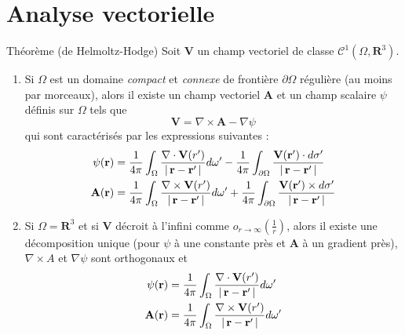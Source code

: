 \section*{Analyse vectorielle}

        \begin{omed}{Théorème (de Helmoltz-Hodge)}
            Soit $\mathbf{V}$ un champ vectoriel de classe $\mathcal{C}^1(\Omega,\mathbf{R}^3)$. 
            \begin{enumerate}[label=($p_{\arabic*}$)]
                \item Si $\Omega$ est un domaine \textit{compact} et \textit{connexe} de frontière $\partial \Omega$ régulière (au moins par morceaux), alors il existe un champ vectoriel $\mathbf{A}$ et un champ scalaire $\psi$ définis sur $\Omega$ tels que 
                \[ \mathbf{V} = \nabla \times \mathbf{A} - \nabla \psi \]    
                qui sont caractérisés par les expressions suivantes : 
                \begin{align*}
                    \psi(\mathbf{r}) &= \frac{1}{4\pi} \int_{\Omega} \frac{\nabla \cdot \mathbf{V}(r')}{\left\lvert \, \mathbf{r} - \mathbf{r}' \, \right\rvert} d\omega' - \frac{1}{4 \pi} \int_{\partial \Omega} \frac{\mathbf{V}(\mathbf{r}') \cdot d\mathbf{\sigma}'}{\left\lvert \, \mathbf{r} - \mathbf{r}' \, \right\rvert} \\
                    \mathbf{A}(\mathbf{r}) &= \frac{1}{4\pi} \int_{\Omega} \frac{\nabla \times \mathbf{V}(r')}{\left\lvert \, \mathbf{r} - \mathbf{r}' \, \right\rvert} d\omega' + \frac{1}{4 \pi} \int_{\partial \Omega} \frac{\mathbf{V}(\mathbf{r}') \times d\mathbf{\sigma}'}{\left\lvert \, \mathbf{r} - \mathbf{r}' \, \right\rvert} 
                \end{align*}
                \item Si $\Omega = \mathbf{R}^3$ et si $\mathbf{V}$ décroit à l’infini comme $o_{r \to \infty} \left(\frac{1}{r}\right)$, alors il existe une décomposition unique (pour $\psi$ à une constante près et $\mathbf{A}$ à un gradient près), $\nabla \times A$ et $\nabla \psi$ sont orthogonaux et 
                \begin{align*}
                    \psi(\mathbf{r}) &= \frac{1}{4\pi} \int_{\Omega} \frac{\nabla \cdot \mathbf{V}(r')}{\left\lvert \, \mathbf{r} - \mathbf{r}' \, \right\rvert} d\omega' \\
                    \mathbf{A}(\mathbf{r}) &= \frac{1}{4\pi} \int_{\Omega} \frac{\nabla \times \mathbf{V}(r')}{\left\lvert \, \mathbf{r} - \mathbf{r}' \, \right\rvert} d\omega'
                \end{align*}
            \end{enumerate}
        \end{omed}

